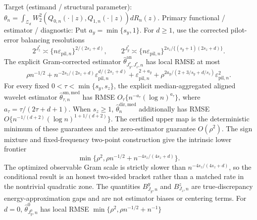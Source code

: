 \documentclass{article}
\begin{document}
Target (estimand / structural parameter): \(\theta_n=\int_{\mathcal Z_d}W_2^2(Q_{0,n}(\cdot\mid z),Q_{1,n}(\cdot\mid z))dR_n(z)\).
Primary functional / estimator / diagnostic: Put \(a_y=\min\{s_y,1\}\). For \(d\ge1\), use the corrected pilot-error balancing resolutions
\[
2^{J_z^*}\asymp\{n\varepsilon_{\mathrm{pil},n}\}^{2/(2s_z+d)},
\qquad
2^{J_y^*}\asymp\{n\varepsilon_{\mathrm{pil},n}\}^{2s_z/\{(s_y+1)(2s_z+d)\}}.
\]
The explicit Gram-corrected estimator \(\widehat\theta^{\mathrm{an}}_{J_y^*,J_z^*,n}\) has local RMSE at most
\[
\rho n^{-1/2}
+n^{-2s_z/(2s_z+d)}\varepsilon_{\mathrm{pil},n}^{d/(2s_z+d)}
+\varepsilon_{\mathrm{pil},n}^{2+a_y}
+\rho^{2a_y/(2+3/s_y+d/s_z)}\varepsilon_{\mathrm{pil},n}^2.
\]
For every fixed \(0<\tau<\min\{s_y,s_z\}\), the explicit median-aggregated aligned wavelet estimator \(\widehat\theta^{\mathrm{sm,med}}_{\tau,n}\) has RMSE \(O_\tau\{n^{-a_\tau}(\log n)^{a_\tau}\}\), where \(a_\tau=\tau/(2\tau+d+1)\). When \(s_z\ge1\), \(\widehat\theta_n^{\mathrm{dir,med}}\) additionally has RMSE \(O\{n^{-1/(d+2)}(\log n)^{1+1/(d+2)}\}\). The certified upper map is the deterministic minimum of these guarantees and the zero-estimator guarantee \(O(\rho^2)\). The sign mixture and fixed-frequency two-point construction give the intrinsic lower frontier
\[
\min\{\rho^2,\rho n^{-1/2}+n^{-4s_z/(4s_z+d)}\}.
\]
The optimized observable Gram scale is strictly slower than \(n^{-4s_z/(4s_z+d)}\), so the conditional result is an honest two-sided bracket rather than a matched rate in the nontrivial quadratic zone.  The quantities \(B^y_{J_y,n}\) and \(B^z_{J_z,n}\) are true-discrepancy energy-approximation gaps and are not estimator biases or centering terms. For \(d=0\), \(\widehat\theta^0_{J_y^0,n}\) has local RMSE \(\min\{\rho^2,\rho n^{-1/2}+n^{-1}\}\)
\end{document}
